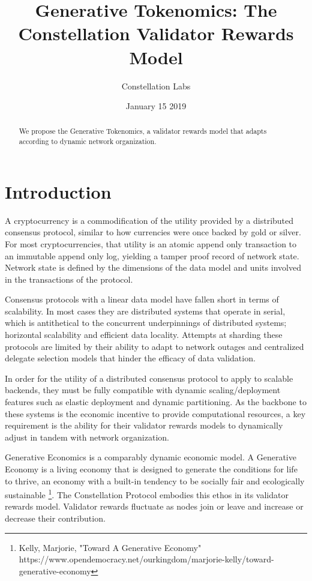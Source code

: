 \documentclass{article}
\title{Generative Tokenomics: The Constellation Validator Rewards Model}
\author{Constellation Labs}
\date{January 15 2019}
\begin{document}
\maketitle

\begin{abstract}
We propose the Generative Tokenomics, a validator rewards model that adapts according to dynamic network organization.
\end{abstract}
\setcounter{secnumdepth}{0}
\section{Introduction}
A cryptocurrency is a commodification of the utility provided by a distributed consensus protocol, similar to how currencies were once backed by gold or silver. For most cryptocurrencies, that utility is an atomic append only transaction to an immutable append only log, yielding a tamper proof record of network state. Network state is defined by the dimensions of the data model and units involved in the transactions of the protocol. 

Consensus protocols with a linear data model have fallen short in terms of scalability. In most cases they are distributed systems that operate in serial, which is antithetical to the concurrent underpinnings of distributed systems; horizontal scalability and efficient data locality. Attempts at sharding these protocols are limited by their ability to adapt to network outages and centralized delegate selection models that hinder the efficacy of data validation.

In order for the utility of a distributed consensus protocol to apply to scalable backends, they must be fully compatible with dynamic scaling/deployment features such as elastic deployment and dynamic partitioning. As the backbone to these systems is the economic incentive to provide computational resources, a key requirement is the ability for their validator rewards models to dynamically adjust in tandem with network organization. 

Generative Economics is a comparably dynamic economic model. A Generative Economy is a living economy that is designed to generate the conditions for life to thrive, an economy with a built-in tendency to be socially fair and ecologically sustainable \footnote{Kelly, Marjorie, "Toward A Generative Economy" https://www.opendemocracy.net/ourkingdom/marjorie-kelly/toward-generative-economy}. The Constellation Protocol embodies this ethos in its validator rewards model. Validator rewards fluctuate as nodes join or leave and increase or decrease their contribution.
\end{document}
